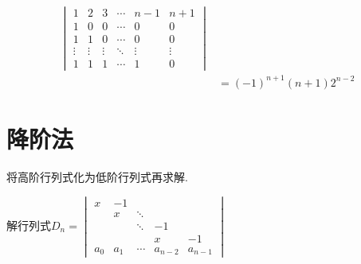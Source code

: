 \begin{solution}
\begin{align*}
        \begin{vmatrix}
            1      & 2      & 3      & \cdots & n-1    & n+1    \\
            1      & 0      & 0      & \cdots & 0      & 0      \\
            1      & 1      & 0      & \cdots & 0      & 0      \\
            \vdots & \vdots & \vdots & \ddots & \vdots & \vdots \\
            1      & 1      & 1      & \cdots & 1      & 0
        \end{vmatrix}                      \\
            & =(-1)^{n+1}(n+1) 2^{n-2}
    \end{align*}
\end{solution}

\section{降阶法}

将高阶行列式化为低阶行列式再求解.

\begin{example}
    解行列式$D_n=\begin{vmatrix}
            x     & -1    &        &         &         \\
                  & x     & \ddots &         &         \\
                  &       & \ddots & -1      &         \\
                  &       &        & x       & -1      \\
            a_{0} & a_{1} & \cdots & a_{n-2} & a_{n-1}
        \end{vmatrix}$
\end{example}

